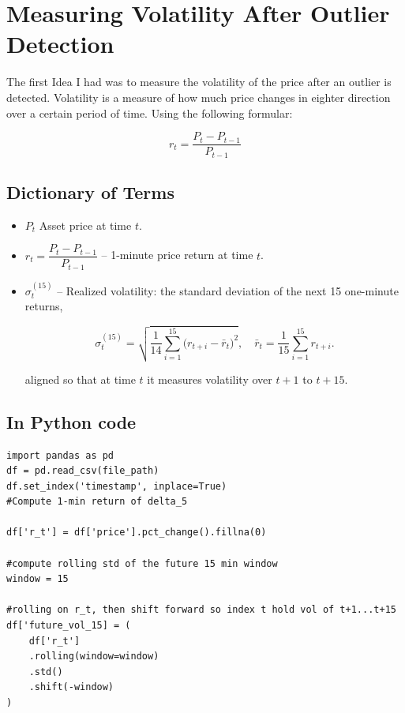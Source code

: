\documentclass[12pt]{article}
\begin{document}
\section{Measuring Volatility After Outlier Detection}

The first Idea I had was to measure the volatility of the price after an outlier is detected. Volatility is a measure of how much price changes in eighter direction over a certain period of time. 
Using the following formular:








\begin{equation}\label{eq:price_return}
    r_t = \frac{P_{t} - P_{t-1}}{P_{t-1}}
\end{equation}


\subsection{Dictionary of Terms}

\begin{itemize}
    \item $P_t$  
      Asset price at time $t$.
    \item $r_t = \dfrac{P_t - P_{t-1}}{P_{t-1}}$  
      – 1-minute price return at time $t$.
    \item $\sigma^{\mathrm{(15)}}_{t}$  
      – Realized volatility: the standard deviation of the next 15 one-minute returns,
      
      

      
      \begin{equation}\label{eq:realized-vol}
        \sigma^{\mathrm{(15)}}_{t}
        = \sqrt{\frac{1}{14}\sum_{i=1}^{15}\bigl(r_{t+i}-\bar r_{t}\bigr)^{2}},
        \quad
        \bar r_{t} = \frac{1}{15}\sum_{i=1}^{15} r_{t+i}.
      \end{equation}
      



      aligned so that at time $t$ it measures volatility over $t+1$ to $t+15$.
\end{itemize}



\subsection{In Python code}

\begin{verbatim}
import pandas as pd
df = pd.read_csv(file_path)
df.set_index('timestamp', inplace=True)
#Compute 1-min return of delta_5

df['r_t'] = df['price'].pct_change().fillna(0)

#compute rolling std of the future 15 min window
window = 15

#rolling on r_t, then shift forward so index t hold vol of t+1...t+15
df['future_vol_15] = (
    df['r_t']
    .rolling(window=window)
    .std()
    .shift(-window)
)
\end{verbatim}
\end{document}
